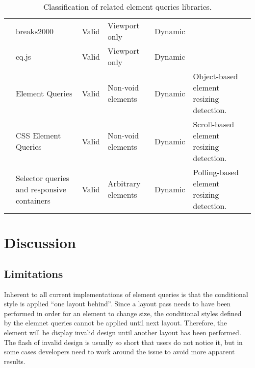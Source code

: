\documentclass{acm_proc_article-sp}
\newcommand{\elq}{ELQ}
\begin{document}
\begin{table*}[ht!]
\begin{tabular}[t]{ l p{3cm} l l l p{3cm} }
      \cite{eq_imp_breaks2000} &            breaks2000 &                                  Valid &     Viewport only &              Dynamic &   \\
      \cite{eq_imp_eqjs} &                  eq.js &                                       Valid &     Viewport only &              Dynamic &   \\
      \cite{eq_imp_element-queries} &       Element Queries &                             Valid &     Non-void elements &   Dynamic &   Object-based element resizing detection. \\
      \cite{eq_imp_css-element-queries} &   CSS Element Queries &                         Valid &     Non-void elements &   Dynamic &   Scroll-based element resizing detection. \\
      \cite{eq_imp_selector_queries} &      Selector queries and responsive containers &  Valid &     Arbitrary elements &  Dynamic &   Polling-based element resizing detection. \\
    \end{tabular}
    \caption{Classification of related element queries libraries.}
    \label{table:approaches-classifications}
  \end{table*}

\section{Discussion}\label{sec:discussion}

  \subsection{Limitations}
    Inherent to all current implementations of element queries is that the conditional style is applied ``one layout behind''.
    Since a layout pass needs to have been performed in order for an element to change size, the conditional styles defined by the elemnet queries cannot be applied until next layout.
    Therefore, the element will be display invalid design until another layout has been performed.
    The flash of invalid design is usually so short that users do not notice it, but in some cases developers need to work around the issue to avoid more apparent results.
\end{document}
